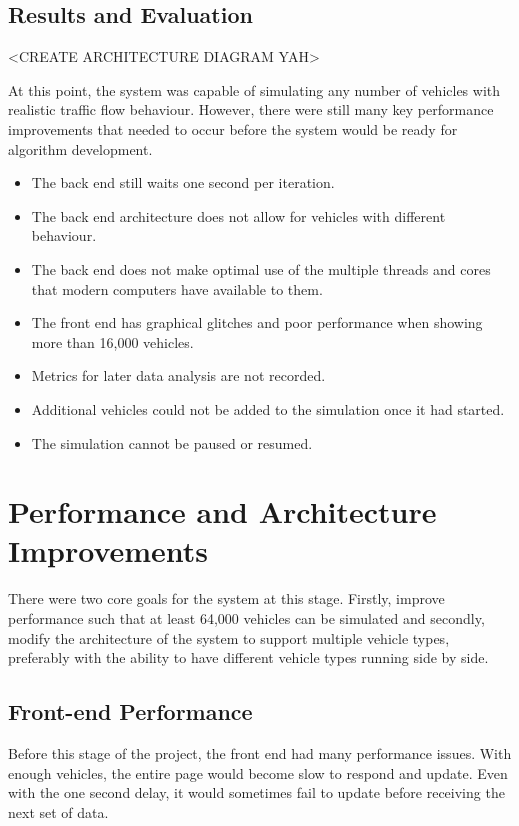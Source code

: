 \documentclass[ %
                    author={Alexander Hill},
                supervisor={Dr. Benjamin Sach},
                    degree={MEng},
                     title={MARMOSET},
                  subtitle={Multi-Agent Route Management using Online Simulation for Efficient Transportation},
                      type={research},
                      year={2016} ]{dissertation}
\begin{document}
\subsection{Results and Evaluation}

<CREATE ARCHITECTURE DIAGRAM YAH>

At this point, the system was capable of simulating any number of vehicles with
realistic traffic flow behaviour. However, there were still many key performance
improvements that needed to occur before the system would be ready for
algorithm development.

\begin{itemize}
    \item The back end still waits one second per iteration.
    \item The back end architecture does not allow for vehicles with different
        behaviour.
    \item The back end does not make optimal use of the multiple threads and
        cores that modern computers have available to them.
    \item The front end has graphical glitches and poor performance when
        showing more than 16,000 vehicles.
    \item Metrics for later data analysis are not recorded.
    \item Additional vehicles could not be added to the simulation once it had
        started.
    \item The simulation cannot be paused or resumed.
\end{itemize}

\section{Performance and Architecture Improvements}

There were two core goals for the system at this stage. Firstly, improve
performance such that at least 64,000 vehicles can be simulated and secondly,
modify the architecture of the system to support multiple vehicle types,
preferably with the ability to have different vehicle types running side by
side.

\subsection{Front-end Performance}

Before this stage of the project, the front end had many performance issues.
With enough vehicles, the entire page would become slow to respond and update.
Even with the one second delay, it would sometimes fail to update before
receiving the next set of data.
\end{document}
